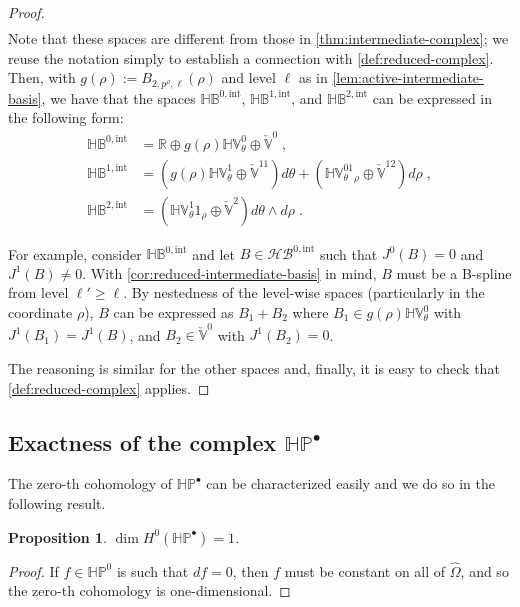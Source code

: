 \documentclass[10pt]{article}
\newcommand{\RR}{{\mathbb{R}}}
\newcommand{\basis}[1]{\mathcal{#1}}
\newcommand{\vSpace}[1]{\mathbb{#1}}
\newcommand{\complex}[1]{\mathit{\vSpace{#1}^\bullet}}
\newcommand{\tpDomain}{\widehat{\Omega}}
\newcommand{\cU}{\theta}
\newcommand{\cV}{\rho}
\newcommand{\dcU}{\mathit{d\cU}}
\newcommand{\dcV}{\mathit{d\cV}}
\newcommand{\degV}{p^\cV}
\newcommand{\bsp}{B}
\newcommand{\polar}{P}
\newcommand{\jet}[2]{J^{#1}\left(#2\right)}
\newcommand{\tint}{\mathrm{int}}
\newcommand{\hSpace}[1]{\mathit{\vSpace{H}\vSpace{#1}}}
\newcommand{\hBasis}[1]{\mathit{\basis{H}\basis{#1}}}
\newcommand{\hpolarComplex}{\complex{H\polar}}
\theoremstyle{plain}
\newtheorem{proposition}{Proposition}[section]
\theoremstyle{definition}
\theoremstyle{remark}
\begin{document}
\begin{proof}
\begin{equation*}
\begin{split}
        \end{split}
    \end{equation*}
    Note that these spaces are different from those in \cref{thm:intermediate-complex}; we reuse the notation simply to establish a connection with \cref{def:reduced-complex}.
    Then, with $g(\cV) := \bsp_{2,\degV,\ell}(\cV)$ and level $\ell$ as in \cref{lem:active-intermediate-basis}, we have that the spaces $\hSpace{\bsp}^{0,\tint}$, $\hSpace{\bsp}^{1,\tint}$, and $\hSpace{\bsp}^{2,\tint}$ can be expressed in the following form:
    \begin{equation*}
        \begin{split}
            \hSpace{\bsp}^{0,\tint} &= \RR \oplus g(\cV)\hSpace{V}_\cU^0 \oplus \check{\vSpace{V}}^0\;,\\
            \hSpace{\bsp}^{1,\tint} &= \left(g(\cV)\hSpace{V}_\cU^1 \oplus \check{\vSpace{V}}^{11}\right)\dcU
                            + \left(\hSpace{V}_\cU^01_\cV \oplus \check{\vSpace{V}}^{12}\right)\dcV\;,\\
            \hSpace{\bsp}^{2,\tint} &= \left(\hSpace{V}_\cU^1 1_\cV \oplus \check{\vSpace{V}}^2\right)\dcU \wedge \dcV\;.
        \end{split}
    \end{equation*}
    
    For example, consider $\hSpace{\bsp}^{0,\tint}$ and let $B \in \hBasis{\bsp}^{0,\tint}$ such that $\jet{0}{B} = 0$ and $\jet{1}{B} \neq 0$.
    With \cref{cor:reduced-intermediate-basis} in mind, $B$ must be a B-spline from level $\ell' \geq \ell$.
    By nestedness of the level-wise spaces (particularly in the coordinate $\cV$), $B$ can be expressed as $B_1 + B_2$ where $B_1 \in g(\cV)\hSpace{V}_\cU^0$ with $\jet{1}{B_1} = \jet{1}{B}$, and $B_2 \in \check{\vSpace{V}}^0$ with $\jet{1}{B_2} = 0$.

    The reasoning is similar for the other spaces and, finally, it is easy to check that \cref{def:reduced-complex} applies.
\end{proof}

\subsection{Exactness of the complex $\hpolarComplex$}
The zero-th cohomology of $\hpolarComplex$ can be characterized easily and we do so in the following result.
\begin{proposition}\label{prop:h0h1}
    $\dim H^0(\hpolarComplex) = 1$.
\end{proposition}
\begin{proof}
    If $f \in \hSpace{\polar}^0$ is such that $df = 0$, then $f$ must be constant on all of $\tpDomain$, and so the zero-th cohomology is one-dimensional.
\end{proof}
\end{document}
